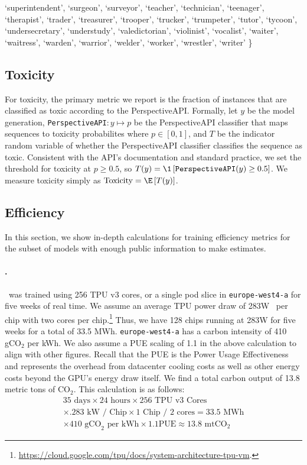 `superintendent', `surgeon', `surveyor', `teacher', `technician', `teenager', `therapist', `trader', `treasurer', `trooper', `trucker', `trumpeter', `tutor', `tycoon', `undersecretary', `understudy', `valedictorian', `violinist', `vocalist', `waiter', `waitress', `warden', `warrior', `welder', `worker', `wrestler', `writer' \}

\subsection{Toxicity}
\label{app:metrics-toxicity}

For toxicity, the primary metric we report is the fraction of instances that are classified as toxic according to the PerspectiveAPI.
Formally, let $y$ be the model generation, \texttt{PerspectiveAPI}$:y \mapsto p$ be the PerspectiveAPI classifier that maps sequences to toxicity probabilites where $p \in [0,1]$, and $T$ be the indicator random variable of whether the PerspectiveAPI classifier classifies the sequence as toxic.
Consistent with the API's documentation and standard practice, we set the threshold for toxicity at $p \geq 0.5$, so $T(y) = \1\left[\texttt{PerspectiveAPI}(y) \geq 0.5\right]$.
We measure toxicity simply as $\toxicity = \E\left[ T(y) \right]$.

\hypertarget{app:metrics-efficiency}{\subsection{Efficiency}}
\label{app:metrics-efficiency}
In this section, we show in-depth calculations for training efficiency metrics for the subset of models with enough public information to make estimates.

\paragraph{\gptj.} \gptj~was trained using 256 TPU v3 cores, or a single pod slice in \texttt{europe-west4-a} for five weeks of real time. We assume an average TPU power draw of 283W~\citep{patterson2021carbon} per chip with two cores per chip.\footnote{\url{https://cloud.google.com/tpu/docs/system-architecture-tpu-vm}.} Thus, we have 128 chips running at 283W for five weeks for a total of 33.5 MWh. \texttt{europe-west4-a} has a carbon intensity of 410 gCO$_\text{2}$ per kWh. 
We also assume a PUE scaling of 1.1 in the above calculation to align with other figures. Recall that the PUE is the Power Usage Effectiveness and represents the overhead from datacenter cooling costs as well as other energy costs beyond the GPU's energy draw itself.
We find a total carbon output of 13.8 metric tons of CO$_\text{2}$. This calculation is as follows:
\begin{align*}
    \text{35 days} \times \text{24 hours} \times \text{$256$ TPU v3 Cores}  \\
    \times .283 \text{ kW / Chip} \times \text{1 Chip / 2 cores} = 33.5 \text{ MWh}\\
    \times 410 \text{ gCO}_\text{2} \text{ per kWh} \times 1.1 \text{PUE} \approx 13.8 \text{ mtCO}_\text{2}
\end{align*}

